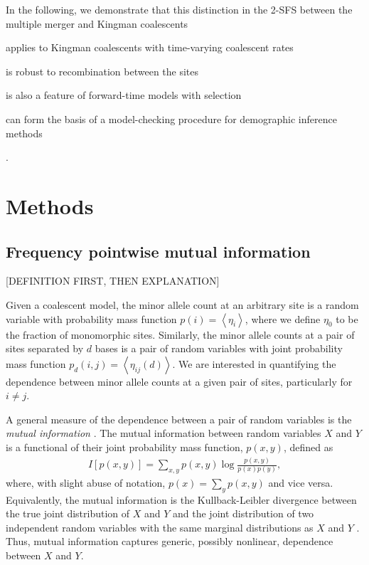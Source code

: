 \documentclass[11pt, letterpaper]{article}   	%
\newcommand{\E}[1]{\left< #1 \right>}
\begin{document}
In the following, we demonstrate that this distinction in the 2-SFS between the multiple merger and Kingman coalescents
\begin{enumerate*}[label=(\roman*), before=\unskip{: }, itemjoin={{; }}, itemjoin*={{, and }}]
    \item applies to Kingman coalescents with time-varying coalescent rates
    \item is robust to recombination between the sites
    \item is also a feature of forward-time models with selection
    \item can form the basis of a model-checking procedure for demographic inference methods
\end{enumerate*}.


\section*{Methods}

\subsection*{Frequency pointwise mutual information}

[DEFINITION FIRST, THEN EXPLANATION]

Given a coalescent model, the minor allele count at an arbitrary site is a random variable with probability mass function $p(i) = \E{\eta_i}$, where we define $\eta_0$ to be the fraction of monomorphic sites.
Similarly, the minor allele counts at a pair of sites separated by $d$ bases is a pair of random variables with joint probability mass function $p_d(i,j) = \E{\eta_{ij}(d)}$.
We are interested in quantifying the dependence between minor allele counts at a given pair of sites, particularly for $i\neq j$.

A general measure of the dependence between a pair of random variables is the \textit{mutual information} \autocite{CoverThomas1991}.
The mutual information between random variables $X$ and $Y$ is a functional of their joint probability mass function, $p(x,y)$, defined as
\begin{align}
    I[p(x,y)] = \sum_{x,y} p(x,y) \log \frac{p(x,y)}{p(x)p(y)},
    \label{eq:mutual_information}
\end{align}
where, with slight abuse of notation, $p(x) = \sum_y p(x,y)$ and vice versa.
Equivalently, the mutual information is the Kullback-Leibler divergence between the true joint distribution of $X$ and $Y$ and the joint distribution of two independent random variables with the same marginal distributions as $X$ and $Y$ \autocite{CoverThomas1991}.
Thus, mutual information captures generic, possibly nonlinear, dependence between $X$ and $Y$.
\end{document}
